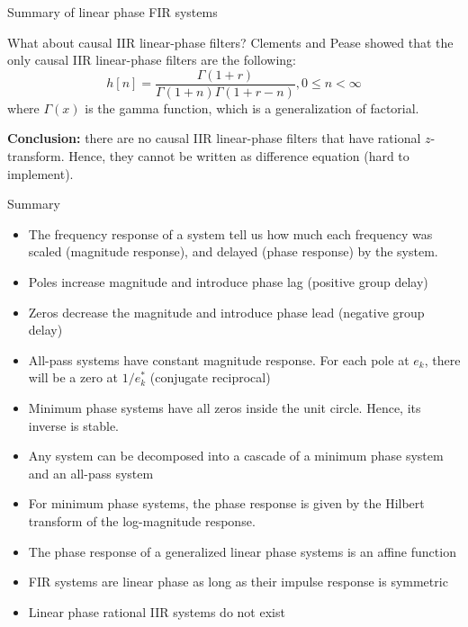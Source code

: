 \documentclass[10pt, handout]{beamer}
\begin{document}
\begin{frame}{Summary of linear phase FIR systems}

\begin{center}
\end{center}

\end{frame}

\begin{frame}{What about causal IIR linear-phase filters?}
Clements and Pease showed that the only causal IIR linear-phase filters are the following:
\begin{equation*}
h[n] = \frac{\Gamma(1 + r)}{\Gamma(1+n)\Gamma(1+r-n)}, 0 \leq n < \infty
\end{equation*}
where $\Gamma(x)$ is the gamma function, which is a generalization of factorial. 

\textbf{Conclusion:} there are no causal IIR linear-phase filters that have rational $z$-transform. Hence, they cannot be written as difference equation (hard to implement).
\end{frame}


\begin{frame}{Summary}
\begin{itemize}
	\item The frequency response of a system tell us how much each frequency was scaled (magnitude response), and delayed (phase response) by the system.
	\item Poles increase magnitude and introduce phase lag (positive group delay)
	\item Zeros decrease the magnitude and introduce phase lead (negative group delay)
	\item All-pass systems have constant magnitude response. For each pole at $e_k$, there will be a zero at $1/e^*_k$ (conjugate reciprocal)
	\item Minimum phase systems have all zeros inside the unit circle. Hence, its inverse is stable.
	\item Any system can be decomposed into a cascade of a minimum phase system and an all-pass system
	\item For minimum phase systems, the phase response is given by the Hilbert transform of the log-magnitude response. 
	\item The phase response of a generalized linear phase systems is an affine function
	\item FIR systems are linear phase as long as their impulse response is symmetric
	\item Linear phase rational IIR systems do not exist
\end{itemize}
\end{frame}
\end{document}
